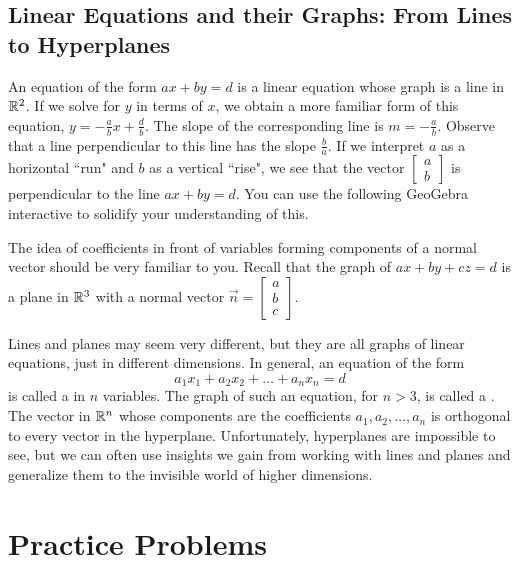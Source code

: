 \documentclass{ximera}
\begin{document}
\subsection*{Linear Equations and their Graphs: From Lines to Hyperplanes}
An equation of the form $ax+by=d$ is a linear equation whose graph is a line in $\mathbb{R}^2$. If we solve for $y$ in terms of $x$, we obtain a more familiar form of this equation, $y=-\frac{a}{b}x+\frac{d}{b}$.  The slope of the corresponding line is $m=-\frac{a}{b}$.  Observe that a line perpendicular to this line has the slope $\frac{b}{a}$.  If we interpret $a$ as a horizontal ``run" and $b$ as a vertical ``rise", we see that the vector $\begin{bmatrix}a\\b\end{bmatrix}$ is perpendicular to the line $ax+by=d$.  You can use the following GeoGebra interactive to solidify your understanding of this.

\begin{center} 
\end{center}

The idea of coefficients in front of variables forming components of a normal vector should be very familiar to you.  Recall that the graph of $ax+by+cz=d$ is a plane in $\mathbb{R}^3$ with a normal vector $\vec{n}=\begin{bmatrix}a\\b\\c\end{bmatrix}$.

Lines and planes may seem very different, but they are all graphs of linear equations, just in different dimensions.  In general, an equation of the form
$$a_1x_1+a_2x_2+\dots +a_nx_n=d$$
is called a  in $n$ variables.  The graph of such an equation, for $n>3$, is called a .  The vector in $\mathbb{R}^n$ whose components are the coefficients $a_1, a_2, \dots ,a_n$ is orthogonal to every vector in the hyperplane.  Unfortunately, hyperplanes are impossible to see, but we can often use insights we gain from working with lines and planes and generalize them to the invisible world of higher dimensions.


\section{Practice Problems}
\end{document}
